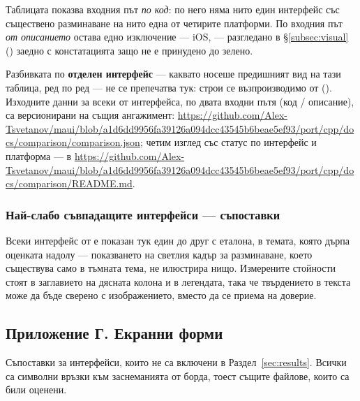 Таблицата показва входния път \emph{по код}: по него няма нито един интерфейс със съществено
разминаване на нито една от четирите платформи. По входния път \emph{от описанието} остава едно
изключение --- iOS,  --- разгледано в §\ref{subsec:visual}
() заедно с констатацията защо не е принудено до зелено.

Разбивката по \textbf{отделен интерфейс} --- каквато носеше предишният вид на тази таблица,
ред по ред --- не се препечатва тук: строи се възпроизводимо от 
(). Изходните данни за всеки от \boardPages{} интерфейса, по двата
входни пътя (код / описание), са версионирани на същия ангажимент:
\url{https://github.com/Alex-Tsvetanov/maui/blob/a1d6dd9956fa39126a094dcc43545b6beae5ef93/port/cpp/docs/comparison/comparison.json};
четим изглед със статус по интерфейс и платформа --- в
\url{https://github.com/Alex-Tsvetanov/maui/blob/a1d6dd9956fa39126a094dcc43545b6beae5ef93/port/cpp/docs/comparison/README.md}.

\subsubsection*{Най-слабо съвпадащите интерфейси --- съпоставки}

Всеки интерфейс от  е показан тук един до друг с еталона, в темата, която
дърпа оценката надолу --- показването на светлия кадър за разминаване, което съществува само
в тъмната тема, не илюстрира нищо. Измерените стойности стоят в заглавието на дясната колона
и в легендата, така че твърдението в текста може да бъде сверено с изображението, вместо да
се приема на доверие.



\subsection*{Приложение Г. Екранни форми}
Съпоставки за интерфейси, които не са включени в Раздел~\ref{sec:results}. Всички са
символни връзки към заснеманията от борда, тоест същите файлове, които са били оценени.



